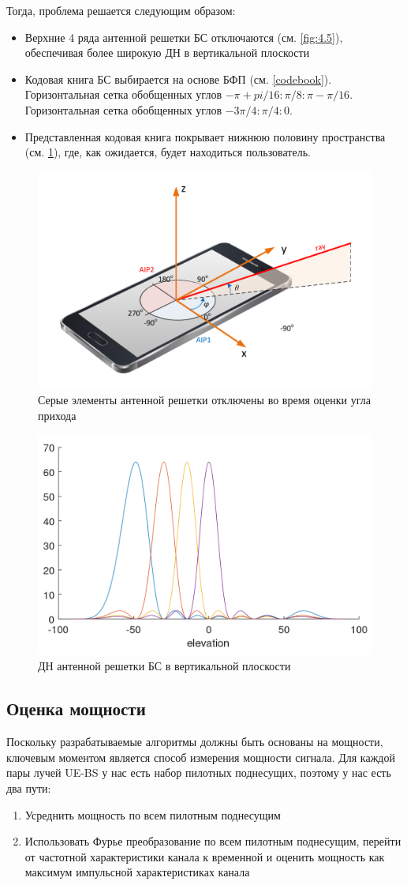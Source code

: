 Тогда, проблема решается следующим образом:
\begin{itemize}
    \item Верхние 4 ряда антенной решетки БС отключаются (см. \ref{fig:4.5}), обеспечивая более широкую ДН в вертикальной плоскости
    \item Кодовая книга БС выбирается на основе БФП (см. \ref{codebook}). Горизонтальная сетка обобщенных углов $-\pi + pi/16:\pi/8:\pi-\pi/16$.
          Горизонтальная сетка обобщенных углов $-3\pi/4:\pi/4:0$.
    \item Представленная кодовая книга покрывает нижнюю половину пространства (см. \ref{fig:4.6}), где, как ожидается, будет находиться пользователь.
\end{itemize}

\begin{figure}[ht]
    \centering
    \includegraphics[width=0.35\linewidth]{figs/fig4.5}
    \caption{Серые элементы антенной решетки отключены во время оценки угла прихода}
    \label{fig:4.6}
\end{figure}

\begin{figure}[ht]
    \centering
    \includegraphics[width=0.5\linewidth]{figs/fig4.6}
    \caption{ДН антенной решетки БС в вертикальной плоскости}
    \label{fig:4.7}
\end{figure}


\subsection{Оценка мощности}
Поскольку разрабатываемые алгоритмы должны быть основаны на мощности, ключевым
моментом является способ измерения мощности сигнала. Для каждой пары лучей UE-BS
у нас есть набор пилотных поднесущих, поэтому у нас есть два пути:
\begin{enumerate}
    \item Усреднить мощность по всем пилотным поднесущим
    \item Использовать Фурье преобразование по всем пилотным поднесущим, перейти от частотной характеристики канала к временной и оценить мощность как максимум импульсной характеристиках канала
\end{enumerate}


